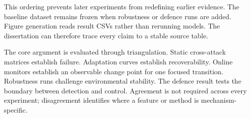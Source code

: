 This ordering prevents later experiments from redefining earlier evidence. The baseline dataset remains frozen when robustness or defence runs are added. Figure generation reads result CSVs rather than rerunning models. The dissertation can therefore trace every claim to a stable source table.

The core argument is evaluated through triangulation. Static cross-attack matrices establish failure. Adaptation curves establish recoverability. Online monitors establish an observable change point for one focused transition. Robustness runs challenge environmental stability. The defence result tests the boundary between detection and control. Agreement is not required across every experiment; disagreement identifies where a feature or method is mechanism-specific.
